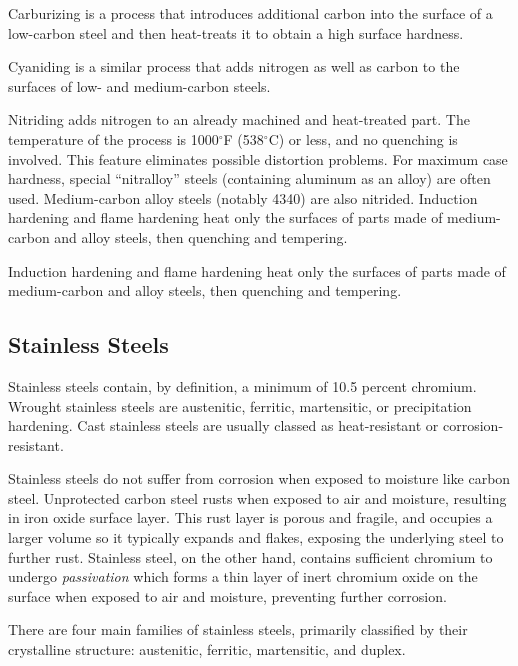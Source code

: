 \documentclass[
10pt,
a4paper,
openany,
svgnames,
]{book}
\begin{document}
Carburizing is a process that introduces additional carbon into the surface of a low-carbon steel and then heat-treats it to obtain a high surface hardness.

Cyaniding is a similar process that adds nitrogen as well as carbon to the surfaces of low- and medium-carbon steels.

Nitriding adds nitrogen to an already machined and heat-treated part. The temperature of the process is 1000$^{\circ}$F (538$^{\circ}$C) or less, and no quenching is involved. This feature eliminates possible distortion problems. For maximum case hardness, special “nitralloy” steels (containing aluminum as an alloy) are often used. Medium-carbon alloy steels (notably 4340) are also nitrided. Induction hardening and flame hardening heat only the surfaces of parts made of medium-carbon and alloy steels, then quenching and tempering.

Induction hardening and flame hardening heat only the surfaces of parts made of medium-carbon and alloy steels, then quenching and tempering.

\subsection{Stainless Steels}

Stainless steels contain, by definition, a minimum of 10.5 percent chromium. Wrought stainless steels are austenitic, ferritic, martensitic, or precipitation hardening. Cast stainless steels are usually classed as heat-resistant or corrosion-resistant.

Stainless steels do not suffer from corrosion when exposed to moisture like carbon steel. Unprotected carbon steel rusts when exposed to air and moisture, resulting in iron oxide surface layer. This rust layer is porous and fragile, and occupies a larger volume so it typically expands and flakes, exposing the underlying steel to further rust. Stainless steel, on the other hand, contains sufficient chromium to undergo \emph{passivation} which forms a thin layer of inert chromium oxide on the surface when exposed to air and moisture, preventing further corrosion.

There are four main families of stainless steels, primarily classified by their crystalline structure: austenitic, ferritic, martensitic, and duplex.
\end{document}
